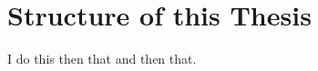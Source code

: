 \documentclass[english, version-2022-01]{uzl-thesis}
\begin{document}
\section{Structure of this Thesis}
I do this then that and then that.







\end{document}
